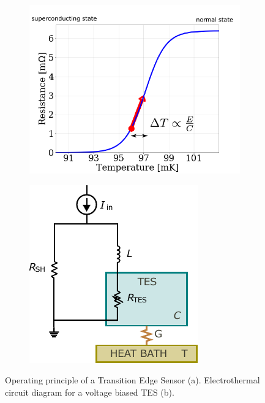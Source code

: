 \begin{figure}[t]
    \begin{subfigure}[b]{0.5\linewidth}
\includegraphics[width=\linewidth]{figures/ch1/TEStheory.pdf}
\caption{}
\end{subfigure}
\hspace{0.5cm}
\begin{subfigure}[b]{0.35\linewidth}
    \includegraphics[width=\linewidth]{figures/ch1/TEScircuit.pdf}
\caption{}
\end{subfigure}
\caption{Operating principle of a Transition Edge Sensor (a). Electrothermal circuit diagram for a voltage
biased TES (b).} 
\label{fig:TEScircuit}
\end{figure}

